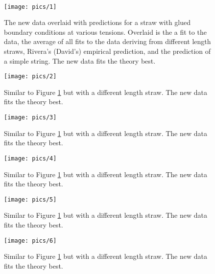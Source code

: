 \documentclass[twoside]{article}
\begin{document}
\begin{multicols}{2}
\


\begin{figure}[H]
	\texttt{[image: pics/1]}
	\caption{The new data overlaid with predictions for a straw with glued boundary conditions at various tensions. Overlaid is the a fit to the data, the average of all fits to the data deriving from different length straws, Rivera's (David's) empirical prediction, and the prediction of a simple string. The new data fits the theory best.
	}
	\label{fig:1}
\end{figure}
\begin{figure}[H]
	\texttt{[image: pics/2]}
	\caption{Similar to Figure \ref{fig:1} but with a different length straw. The new data fits the theory best.
	}
	\label{fig:2}
\end{figure}
\begin{figure}[H]
	\texttt{[image: pics/3]}
	\caption{Similar to Figure \ref{fig:1} but with a different length straw. The new data fits the theory best.
}
	\label{fig:3}
\end{figure}
\begin{figure}[H]
	\texttt{[image: pics/4]}
	\caption{Similar to Figure \ref{fig:1} but with a different length straw. The new data fits the theory best.
}
	\label{fig:4}
\end{figure}
\begin{figure}[H]
	\texttt{[image: pics/5]}
	\caption{Similar to Figure \ref{fig:1} but with a different length straw. The new data fits the theory best.
}
	\label{fig:5}
\end{figure}
\begin{figure}[H]
	\texttt{[image: pics/6]}
	\caption{Similar to Figure \ref{fig:1} but with a different length straw. The new data fits the theory best.
}
	\label{fig:6}
\end{figure}





\end{multicols}
\end{document}
